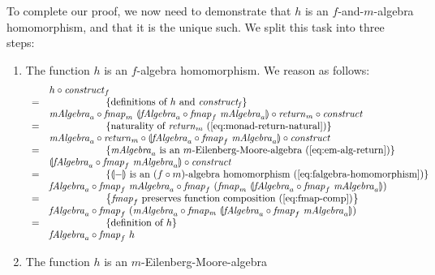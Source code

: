 \documentclass{jfp1}
\newcommand{\fold}[1]{\llparenthesis #1 \rrparenthesis}
\newcommand{\eqAnnotation}[1]{\hspace{2cm}\left\{\textrm{#1}\right\}}
\begin{document}
\begin{proof*}
  To complete our proof, we now need to demonstrate that $h$ is an
  $f$-and-$m$-algebra homomorphism, and that it is the unique such. We
  split this task into three steps:
  \begin{enumerate}
  \item The function $h$ is an $f$-algebra homomorphism. We reason as
    follows:
    \begin{displaymath}
      \begin{array}{cl}
        & h \circ \mathit{construct}_f \\
        =&\eqAnnotation{definitions of $h$ and $\mathit{construct_f}$} \\
         &\mathit{mAlgebra}_a \circ \mathit{fmap}_m~\fold{\mathit{fAlgebra}_a \circ \mathit{fmap}_f~\mathit{mAlgebra}_a} \circ \mathit{return}_m \circ \mathit{construct} \\
        =&\eqAnnotation{naturality of $\mathit{return}_m$ (\autoref{eq:monad-return-natural})} \\
         &\mathit{mAlgebra}_a \circ \mathit{return}_m \circ \fold{\mathit{fAlgebra}_a \circ \mathit{fmap}_f~\mathit{mAlgebra}_a} \circ \mathit{construct} \\
        =&\eqAnnotation{$\mathit{mAlgebra}_a$ is an $m$-Eilenberg-Moore-algebra (\autoref{eq:em-alg-return})} \\
         &\fold{\mathit{fAlgebra}_a \circ \mathit{fmap}_f~\mathit{mAlgebra}_a} \circ \mathit{construct} \\
        =&\eqAnnotation{$\fold{-}$ is an $(f \circ m)$-algebra homomorphism (\autoref{eq:falgebra-homomorphism})} \\
         &\mathit{fAlgebra}_a \circ \mathit{fmap}_f~\mathit{mAlgebra}_a \circ \mathit{fmap}_f~(\mathit{fmap}_m~\fold{\mathit{fAlgebra}_a \circ \mathit{fmap}_f~\mathit{mAlgebra}_a}) \\
        =&\eqAnnotation{$\mathit{fmap}_f$ preserves function composition (\autoref{eq:fmap-comp})} \\
         &\mathit{fAlgebra}_a \circ \mathit{fmap}_f~(\mathit{mAlgebra}_a \circ \mathit{fmap_m}~\fold{\mathit{fAlgebra}_a \circ \mathit{fmap}_f~\mathit{mAlgebra}_a}) \\
        =&\eqAnnotation{definition of $h$} \\
         & \mathit{fAlgebra}_a \circ \mathit{fmap}_f~h
      \end{array}
    \end{displaymath}
  \item The function $h$ is an $m$-Eilenberg-Moore-algebra

\end{enumerate}
\end{proof*}
\end{document}
